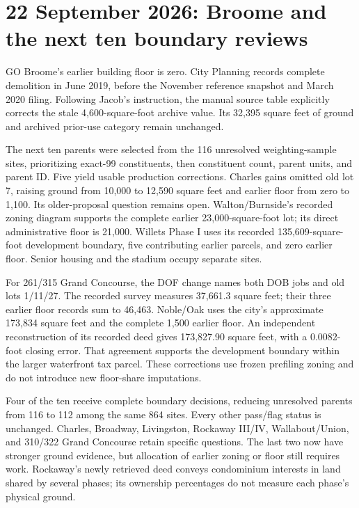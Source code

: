 \section{22 September 2026: Broome and the next ten boundary reviews}

GO Broome's earlier building floor is zero. City Planning records complete
demolition in June 2019, before the November reference snapshot and March
2020 filing. Following Jacob's instruction, the manual source table explicitly
corrects the stale 4,600-square-foot archive value. Its 32,395 square feet of
ground and archived prior-use category remain unchanged.

The next ten parents were selected from the 116 unresolved weighting-sample
sites, prioritizing exact-99 constituents, then constituent count, parent units,
and parent ID. Five yield usable production corrections. Charles gains omitted
old lot 7, raising ground from 10,000 to 12,590 square feet and earlier floor
from zero to 1,100. Its older-proposal question remains open. Walton/Burnside's
recorded zoning diagram supports the complete earlier 23,000-square-foot lot;
its direct administrative floor is 21,000. Willets Phase I uses its recorded
135,609-square-foot development boundary, five contributing earlier parcels,
and zero earlier floor. Senior housing and the stadium occupy separate sites.

For 261/315 Grand Concourse, the DOF change names both DOB jobs and old lots
1/11/27. The recorded survey measures 37,661.3 square feet; their three earlier
floor records sum to 46,463. Noble/Oak uses the city's approximate 173,834
square feet and the complete 1,500 earlier floor. An independent reconstruction
of its recorded deed gives 173,827.90 square feet, with a 0.0082-foot closing
error. That agreement supports the development boundary within the larger
waterfront tax parcel. These corrections use frozen prefiling zoning and do
not introduce new floor-share imputations.

Four of the ten receive complete boundary decisions, reducing unresolved
parents from 116 to 112 among the same 864 sites. Every other pass/flag status
is unchanged. Charles, Broadway,
Livingston, Rockaway III/IV, Wallabout/Union, and 310/322 Grand Concourse retain
specific questions. The last two now have stronger ground evidence, but
allocation of earlier zoning or floor still requires work. Rockaway's newly
retrieved deed conveys condominium interests in land shared by several phases;
its ownership percentages do not measure each phase's physical ground.

